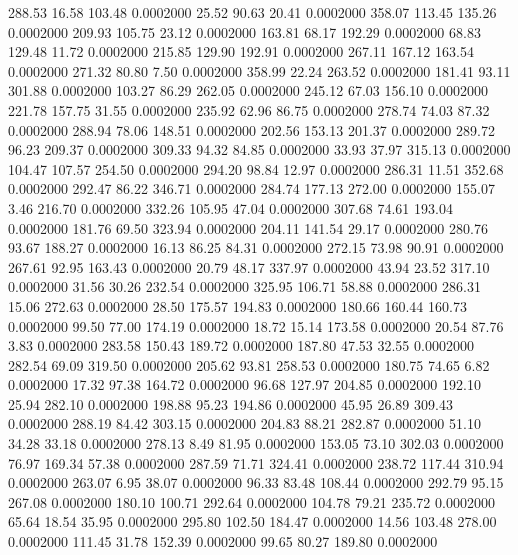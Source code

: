  288.53   16.58  103.48   0.0002000
  25.52   90.63   20.41   0.0002000
 358.07  113.45  135.26   0.0002000
 209.93  105.75   23.12   0.0002000
 163.81   68.17  192.29   0.0002000
  68.83  129.48   11.72   0.0002000
 215.85  129.90  192.91   0.0002000
 267.11  167.12  163.54   0.0002000
 271.32   80.80    7.50   0.0002000
 358.99   22.24  263.52   0.0002000
 181.41   93.11  301.88   0.0002000
 103.27   86.29  262.05   0.0002000
 245.12   67.03  156.10   0.0002000
 221.78  157.75   31.55   0.0002000
 235.92   62.96   86.75   0.0002000
 278.74   74.03   87.32   0.0002000
 288.94   78.06  148.51   0.0002000
 202.56  153.13  201.37   0.0002000
 289.72   96.23  209.37   0.0002000
 309.33   94.32   84.85   0.0002000
  33.93   37.97  315.13   0.0002000
 104.47  107.57  254.50   0.0002000
 294.20   98.84   12.97   0.0002000
 286.31   11.51  352.68   0.0002000
 292.47   86.22  346.71   0.0002000
 284.74  177.13  272.00   0.0002000
 155.07    3.46  216.70   0.0002000
 332.26  105.95   47.04   0.0002000
 307.68   74.61  193.04   0.0002000
 181.76   69.50  323.94   0.0002000
 204.11  141.54   29.17   0.0002000
 280.76   93.67  188.27   0.0002000
  16.13   86.25   84.31   0.0002000
 272.15   73.98   90.91   0.0002000
 267.61   92.95  163.43   0.0002000
  20.79   48.17  337.97   0.0002000
  43.94   23.52  317.10   0.0002000
  31.56   30.26  232.54   0.0002000
 325.95  106.71   58.88   0.0002000
 286.31   15.06  272.63   0.0002000
  28.50  175.57  194.83   0.0002000
 180.66  160.44  160.73   0.0002000
  99.50   77.00  174.19   0.0002000
  18.72   15.14  173.58   0.0002000
  20.54   87.76    3.83   0.0002000
 283.58  150.43  189.72   0.0002000
 187.80   47.53   32.55   0.0002000
 282.54   69.09  319.50   0.0002000
 205.62   93.81  258.53   0.0002000
 180.75   74.65    6.82   0.0002000
  17.32   97.38  164.72   0.0002000
  96.68  127.97  204.85   0.0002000
 192.10   25.94  282.10   0.0002000
 198.88   95.23  194.86   0.0002000
  45.95   26.89  309.43   0.0002000
 288.19   84.42  303.15   0.0002000
 204.83   88.21  282.87   0.0002000
  51.10   34.28   33.18   0.0002000
 278.13    8.49   81.95   0.0002000
 153.05   73.10  302.03   0.0002000
  76.97  169.34   57.38   0.0002000
 287.59   71.71  324.41   0.0002000
 238.72  117.44  310.94   0.0002000
 263.07    6.95   38.07   0.0002000
  96.33   83.48  108.44   0.0002000
 292.79   95.15  267.08   0.0002000
 180.10  100.71  292.64   0.0002000
 104.78   79.21  235.72   0.0002000
  65.64   18.54   35.95   0.0002000
 295.80  102.50  184.47   0.0002000
  14.56  103.48  278.00   0.0002000
 111.45   31.78  152.39   0.0002000
  99.65   80.27  189.80   0.0002000
